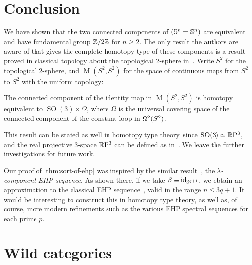 \documentclass[english,a4paper]{lmcs}
\begin{document}
\section{Conclusion}
\label{sec:conclusions}


\newcommand{\topSp}{S^2}%
We have shown that the two connected components of $({\mathbb S^{n}} = {\mathbb S^{n}})$
are equivalent and have fundamental group $\mathbb{Z}/2\mathbb{Z}$ for $n\ge2$.
The only result the authors are aware of that gives
the complete homotopy type of these
components is a result proved in classical topology about the topological
$2$-sphere in~\cite[Sec.~5]{hansen}. Write $\topSp$ for the topological
$2$-sphere, and $\operatorname M(\topSp,\topSp)$ for the space of continuous
maps from $\topSp$ to $\topSp$ with the uniform topology:
\begin{thm}
  The connected component of the identity map in $\operatorname M(\topSp,\topSp)$
  is homotopy equivalent to $\operatorname{SO}(3)\times \Omega$, where $\Omega$
  is the universal covering space of the connected component of the constant
  loop in $\loopspace 2 (\topSp)$.
  \label{thm:hansen}
\end{thm}
This result can be stated as well in homotopy type theory,
since $\operatorname{SO}(3) \simeq \mathbb{R}\mathrm{P}^3$,
and the real projective $3$-space $\mathbb{R}\mathrm{P}^3$
can be defined as in~\cite{BuchholtzRijke2017}.
We leave the further investigations for future work.

Our proof of \cref{thm:sort-of-ehp} was inspired by
the similar result~\cite[Theorem~2.7]{lang1973},
the \emph{$\lambda$-component EHP sequence}.
As shown there, if we take $\beta\equiv\mathord{\mathrm{id}}_{{\mathbb S^{q+1}}}$,
we obtain an approximation to the classical EHP sequence~\cite{gwwhitehead1953}, valid in the range $n\le3q+1$.
It would be interesting to construct this in homotopy type theory,
as well as, of course, more modern refinements such as the various
EHP spectral sequences for each prime $p$.




\appendix
\section{Wild categories}
%
\end{document}
